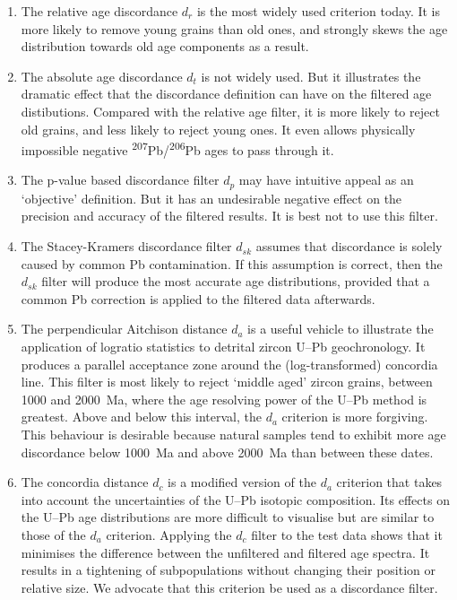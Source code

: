 \documentclass{article}
\begin{document}
\begin{enumerate}
  \item The relative age discordance $d_r$ is the most widely used
    criterion today. It is more likely to remove young grains than old
    ones, and strongly skews the age distribution towards old age
    components as a result.
  \item The absolute age discordance $d_t$ is not widely used. But it
    illustrates the dramatic effect that the discordance definition
    can have on the filtered age distibutions. Compared with the
    relative age filter, it is more likely to reject old grains, and
    less likely to reject young ones. It even allows physically
    impossible negative
    \textsuperscript{207}Pb/\textsuperscript{206}Pb ages to pass
    through it.
  \item The p-value based discordance filter $d_p$ may have intuitive
    appeal as an `objective' definition. But it has an undesirable
    negative effect on the precision and accuracy of the filtered
    results. It is best not to use this filter.
  \item The Stacey-Kramers discordance filter $d_{sk}$ assumes that
    discordance is solely caused by common Pb contamination. If this
    assumption is correct, then the $d_{sk}$ filter will produce the
    most accurate age distributions, provided that a
    \citet{stacey1975} common Pb correction is applied to the filtered
    data afterwards.
  \item The perpendicular Aitchison distance $d_a$ is a useful vehicle
    to illustrate the application of logratio statistics to detrital
    zircon U--Pb geochronology. It produces a parallel acceptance zone
    around the (log-transformed) concordia line. This filter is most
    likely to reject `middle aged' zircon grains, between 1000 and
    2000~Ma, where the age resolving power of the U--Pb method is
    greatest. Above and below this interval, the $d_a$ criterion is
    more forgiving. This behaviour is desirable because natural
    samples tend to exhibit more age discordance below 1000~Ma and
    above 2000~Ma than between these dates.
  \item The concordia distance $d_c$ is a modified version of the
    $d_a$ criterion that takes into account the uncertainties of the
    U--Pb isotopic composition.  Its effects on the U--Pb age
    distributions are more difficult to visualise but are similar to
    those of the $d_a$ criterion.  Applying the $d_c$ filter to the
    test data shows that it minimises the difference between the
    unfiltered and filtered age spectra. It results in a tightening of
    subpopulations without changing their position or relative
    size. We advocate that this criterion be used as a discordance
    filter.
\end{enumerate}
\end{document}
